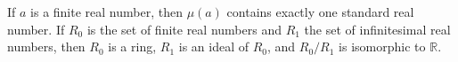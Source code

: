 If $a$ is a finite real number, then $\mu(a)$ contains exactly one standard real number. If $R_0$ is the set of finite real numbers and $R_1$ the set of infinitesimal real numbers, then $R_0$ is a ring, $R_1$ is an ideal of $R_0$, and $R_0 / R_1$ is isomorphic to $\mathbb{R}$.
